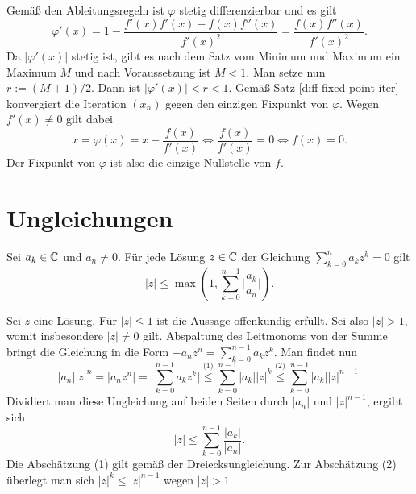 \begin{Beweis}
Gemäß den Ableitungsregeln ist $\varphi$ stetig differenzierbar
und es gilt%
\[\varphi'(x) = 1-\frac{f'(x)f'(x)-f(x)f''(x)}{f'(x)^2}
= \frac{f(x)f''(x)}{f'(x)^2}.\]
Da $|\varphi'(x)|$ stetig ist, gibt es nach dem Satz vom Minimum
und Maximum ein Maximum $M$ und nach Voraussetzung ist $M<1$.
Man setze nun $r:=(M+1)/2$. Dann ist $|\varphi'(x)|<r<1$.
Gemäß Satz \ref{diff-fixed-point-iter} konvergiert die Iteration
$(x_n)$ gegen den einzigen Fixpunkt von $\varphi$. Wegen $f'(x)\ne 0$
gilt dabei%
\[x = \varphi(x) = x-\frac{f(x)}{f'(x)} \iff \frac{f(x)}{f'(x)}=0\iff f(x)=0.\]
Der Fixpunkt von $\varphi$ ist also die einzige Nullstelle von $f$.\;\qedsymbol
\end{Beweis}

\newpage
\section{Ungleichungen}

\begin{Satz}%
\newlinefirst
Sei $a_k\in\mathbb C$ und $a_n\ne 0$. Für jede Lösung $z\in\mathbb C$ der Gleichung
$\sum_{k=0}^n a_k z^k = 0$ gilt%
\[|z|\le\max(1,\sum_{k=0}^{n-1}\bigg|\frac{a_k}{a_n}\bigg|).\]
\end{Satz}
\begin{Beweis}
Sei $z$ eine Lösung. Für $|z|\le 1$ ist die Aussage offenkundig
erfüllt. Sei also $|z|>1$, womit insbesondere $|z|\ne 0$ gilt.
Abspaltung des Leitmonoms von der Summe bringt die Gleichung in die
Form $-a_n z^n = \sum_{k=0}^{n-1} a_k z^k$.
Man findet nun%
\[|a_n| |z|^n = |a_n z^n| = \bigg|\sum_{k=0}^{n-1} a_k z^k\bigg|
\stackrel{\text{(1)}}\le\sum_{k=0}^{n-1} |a_k| |z|^k
\stackrel{\text{(2)}}\le\sum_{k=0}^{n-1} |a_k| |z|^{n-1}.\]
Dividiert man diese Ungleichung auf beiden Seiten durch $|a_n|$
und $|z|^{n-1}$, ergibt sich%
\[|z|\le \sum_{k=0}^{n-1}\frac{|a_k|}{|a_n|}.\]
Die Abschätzung (1) gilt gemäß der Dreiecksungleichung. Zur
Abschätzung (2) überlegt man sich $|z|^k\le |z|^{n-1}$ wegen
$|z|>1$.\,\qedsymbol
\end{Beweis}

